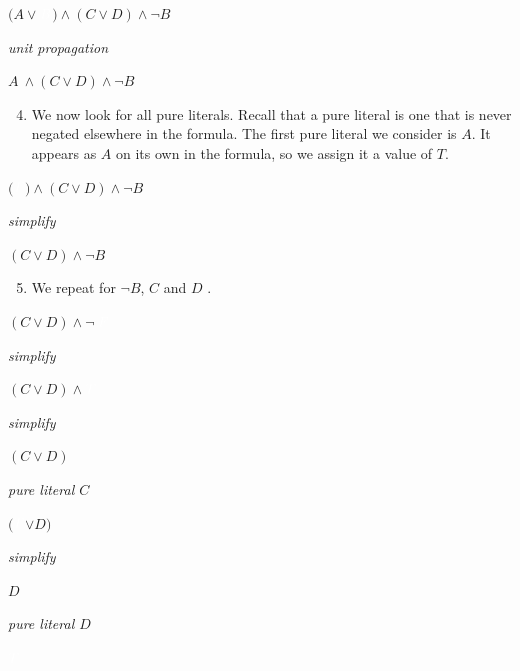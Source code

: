 \documentclass[a4paper,openany,12pt]{book}
\begin{document}
\begin{center}
\setlength{\fboxsep}{2pt}
\(
(A \lor \)\colorbox{id7-aubergine}{$ \textcolor{white}{B}$}\() \land (C \lor D) \land \neg B\)

\emph{unit propagation}

\(A ~\land (C \lor D) \land \neg B\)

\end{center}

\begin{enumerate}
      \setcounter{enumi}{3}
      \item We now look for all pure literals. Recall that a pure literal is one that is never negated elsewhere in the formula. The first pure literal we consider is $A$. It appears as $A$ on its own in the formula, so we assign it a value of $T$.
\end{enumerate}

\begin{center}
    \setlength{\fboxsep}{2pt}
    \(
    (\)\colorbox{id7-aubergine}{$ \textcolor{white}{T}$}\() \land (C \lor D) \land \neg B\)
    
    \emph{simplify}
    
    \((C \lor D) \land \neg B\)
\end{center}


\begin{enumerate}
\setcounter{enumi}{4}
\item We repeat for $\neg B$, $C$ and $D$ .
\end{enumerate}

\begin{center}
    \setlength{\fboxsep}{2pt}
    
    \((C \lor D) \land \neg ~ \)\colorbox{id7-aubergine}{$ \textcolor{white}{F}$}
    
    \emph{simplify}
    
    \((C \lor D) \land \)\colorbox{id7-aubergine}{$ \textcolor{white}{T}$}
        
    \emph{simplify}
    
    \((C \lor D)\)
    
    \emph{pure literal $C$}
    
    \((\)\colorbox{id7-aubergine}{$ \textcolor{white}{T}$}\( \lor D)\)
        
    \emph{simplify}
    
    \(D\)
    
    \emph{pure literal $D$}
    
    \colorbox{id7-aubergine}{$ \textcolor{white}{T}$}
\end{center}
\end{document}
